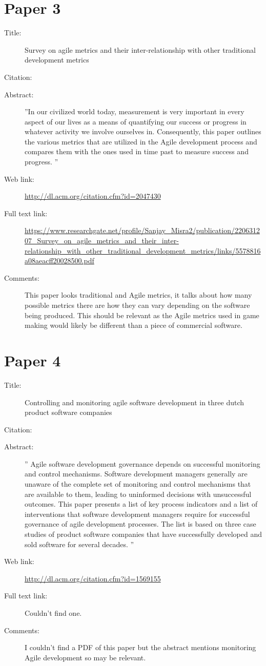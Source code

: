 \documentclass{scrartcl}
\begin{document}
\section*{Paper 3}
\begin{description}
	\item[Title:] Survey on agile metrics and their inter-relationship with other traditional development metrics
	\item[Citation:] \cite{Misra}
	\item[Abstract:] ''In our civilized world today, measurement is very important in every aspect of our lives as a means of quantifying our success or progress in whatever activity we involve ourselves in. Consequently, this paper outlines the various metrics that are utilized in the Agile development process and compares them with the ones used in time past to measure success and progress. ''
	\item[Web link:] \url{http://dl.acm.org/citation.cfm?id=2047430}
	\item[Full text link:] \url{https://www.researchgate.net/profile/Sanjay_Misra2/publication/220631207_Survey_on_agile_metrics_and_their_inter-relationship_with_other_traditional_development_metrics/links/5578816a08aeacff20028500.pdf}
	\item[Comments:] This paper looks traditional and Agile metrics, it talks about how many possible metrics there are how they can vary depending on the software being produced. This should be relevant as the Agile metrics used in game making would likely be different than a piece of commercial software.
\end{description}

\section*{Paper 4}
\begin{description}
	\item[Title:] Controlling and monitoring agile software development in three dutch product software companies
	\item[Citation:] \cite{Cheng}
	\item[Abstract:] '' Agile software development governance depends on successful monitoring and control mechanisms. Software development managers generally are unaware of the complete set of monitoring and control mechanisms that are available to them, leading to uninformed decisions with unsuccessful outcomes. This paper presents a list of key process indicators and a list of interventions that software development managers require for successful governance of agile development processes. The list is based on three case studies of product software companies that have successfully developed and sold software for several decades. ''
	\item[Web link:] \url{http://dl.acm.org/citation.cfm?id=1569155}
	\item[Full text link:] Couldn't find one.
	\item[Comments:] I couldn't find a PDF of this paper but the abstract mentions monitoring Agile development so may be relevant.
\end{description}
\end{document}
